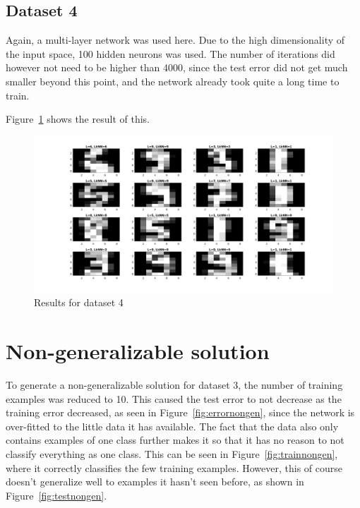 \documentclass{article}
\begin{document}
\subsection{Dataset 4}

Again, a multi-layer network was used here. Due to the high dimensionality of
the input space, 100 hidden neurons was used. The number of
iterations did however not need to be higher than 4000, since the test error
did not get much smaller beyond this point, and the network already took quite
a long time to train.

Figure~\ref{fig:res4} shows the result of this.

\begin{figure}
    \includegraphics[width=13cm]{dataset4res.png}
    \caption{Results for dataset 4}
    \label{fig:res4}
\end{figure}

\section{Non-generalizable solution}

To generate a non-generalizable solution for dataset 3, the number of training
examples was reduced to 10. This caused the test error to not decrease as the
training error decreased, as seen in Figure~\ref{fig:errornongen}, since the
network is over-fitted to the little data it has available. The fact that the
data also only contains examples of one class further makes it so that it has
no reason to not classify everything as one class. This can be seen in 
Figure~\ref{fig:trainnongen}, where it correctly classifies the few training
examples. However, this of course doesn't generalize well to examples it hasn't
seen before, as shown in Figure~\ref{fig:testnongen}.
\end{document}
